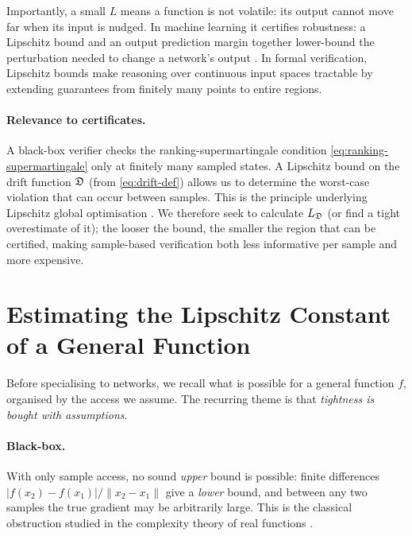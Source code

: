 Importantly, a small $L$ means a function is not volatile: its output cannot move far when its input is nudged. In machine learning it certifies robustness: a Lipschitz bound and an output prediction margin together lower-bound the perturbation needed to change a network's output \cite{tsuzuku2018lipschitz}. In formal verification, Lipschitz bounds make reasoning over continuous input spaces tractable by extending guarantees from finitely many points to entire regions.

\paragraph{Relevance to certificates.} A black-box verifier checks the ranking-supermartingale condition \eqref{eq:ranking-supermartingale} only at finitely many sampled states. A Lipschitz bound on the drift function $\mathfrak{D}$ (from \eqref{eq:drift-def}) allows us to determine the worst-case violation that can occur between samples. This is the principle underlying Lipschitz global optimisation \cite{shubert1972sequential}. We therefore seek to calculate $L_{\mathfrak{D}}$ (or find a tight overestimate of it); the looser the bound, the smaller the region that can be certified, making sample-based verification both less informative per sample and more expensive.


\section{Estimating the Lipschitz Constant of a General Function}
\label{estimation}

Before specialising to networks, we recall what is possible for a general function $f$, organised by the access we assume. The recurring theme is that \emph{tightness is bought with assumptions}.

\paragraph{Black-box.} With only sample access, no sound \emph{upper} bound is possible: finite differences $|f(x_2)-f(x_1)|/\|x_2-x_1\|$ give a \emph{lower} bound, and between any two samples the true gradient may be arbitrarily large. This is the classical obstruction studied in the complexity theory of real functions \cite{ko1991complexity}.


